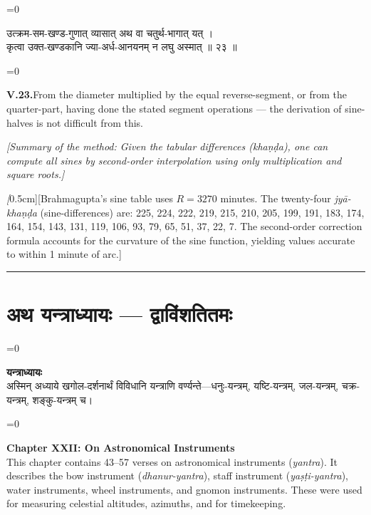 \documentclass[11pt,a4paper]{article}
\newcommand{\longline}{\noindent\rule{\textwidth}{0.4pt}}
\newcommand{\cnote}[1]{\textcolor{notecolor}{\textit{#1}}}
\newcommand{\dev}[1]{{\devanagarifont\color{sktcolor}#1}}
\newcommand{\dsec}[1]{\section*{\dev{#1}}}
\newcommand{\iast}[1]{\textit{#1}}
\newenvironment{paracol}[1]{\begingroup}{\endgroup}
\newcommand{\switchcolumn}[1][]{%
  \ifnum#1=0\relax\else\par\nobreak\vspace{0.5em}\par\nobreak\fi%
}
\begin{document}
\vspace{0.3cm}

\begin{paracol}{2}
\switchcolumn[0]
\dev{%
उत्क्रम-सम-खण्ड-गुणात् व्यासात् अथ वा चतुर्थ-भागात् यत् ।\\
कृत्वा उक्त-खण्डकानि ज्या-अर्ध-आनयनम् न लघु अस्मात् ॥ २३ ॥
}

\switchcolumn[1]
\textbf{V.23.}\quad From the diameter multiplied by the equal
reverse-segment, or from the quarter-part, having done the stated
segment operations — the derivation of sine-halves is not
difficult from this.

\medskip
\textit{[Summary of the method: Given the tabular differences
(\iast{khaṇḍa}), one can compute all sines by second-order
interpolation using only multiplication and square roots.]}
\end{paracol}

\vspace{0.5cm}
\cnote[0.5cm]{[Brahmagupta's sine table uses $R = 3270$ minutes. The
twenty-four \iast{jyā-khaṇḍa} (sine-differences) are: 225, 224, 222,
219, 215, 210, 205, 199, 191, 183, 174, 164, 154, 143, 131, 119,
106, 93, 79, 65, 51, 37, 22, 7. The second-order correction
formula accounts for the curvature of the sine function, yielding
values accurate to within 1 minute of arc.]}

\longline
\newpage

\dsec{अथ यन्त्राध्यायः — द्वाविंशतितमः}

\begin{paracol}{2}
\switchcolumn[0]
\dev{%
\textbf{यन्त्राध्यायः}\\[0.2cm]
अस्मिन् अध्याये खगोल-दर्शनार्थं विविधानि यन्त्राणि
वर्ण्यन्ते—धनुः-यन्त्रम्, यष्टि-यन्त्रम्, जल-यन्त्रम्,
चक्र-यन्त्रम्, शङ्कु-यन्त्रम् च।
}

\switchcolumn[1]
\textbf{Chapter XXII: On Astronomical Instruments}\\[0.2cm]
This chapter contains 43–57 verses on astronomical instruments
(\iast{yantra}). It describes the bow instrument
(\iast{dhanur-yantra}), staff instrument (\iast{yaṣṭi-yantra}),
water instruments, wheel instruments, and gnomon instruments.
These were used for measuring celestial altitudes, azimuths, and
for timekeeping.
\end{paracol}
\end{document}
